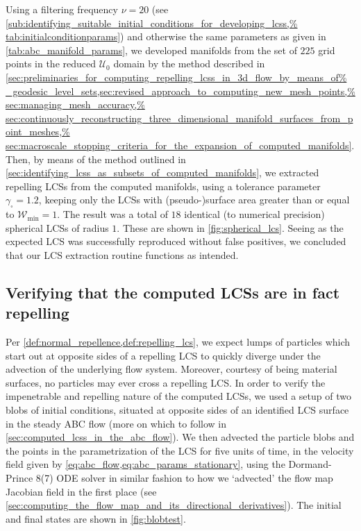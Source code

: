 Using a filtering frequency $\nu=20$ (see
\cref{sub:identifying_suitable_initial_conditions_for_developing_lcss,%
tab:initialconditionparams}) and otherwise the same parameters as given
in \cref{tab:abc_manifold_params}, we developed manifolds from the set
of $225$ grid points in the reduced $\mathcal{U}_{0}$ domain by the method
described in
\cref{sec:preliminaries_for_computing_repelling_lcss_in_3d_flow_by_means_of%
    _geodesic_level_sets,sec:revised_approach_to_computing_new_mesh_points,%
    sec:managing_mesh_accuracy,%
    sec:continuously_reconstructing_three_dimensional_manifold_surfaces_from_point_meshes,%
    sec:macroscale_stopping_criteria_for_the_expansion_of_computed_manifolds}.
Then, by means of the method outlined in
\cref{sec:identifying_lcss_as_subsets_of_computed_manifolds}, we extracted
repelling LCSs from the computed manifolds, using a tolerance parameter
$\gamma_{\square}=1.2$, keeping only the LCSs with (pseudo-)surface area
greater than or equal to $\mathcal{W}_{\min}=1$. The result was a total of
$18$ identical (to numerical precision) spherical LCSs of radius $1$. These are
shown in \cref{fig:spherical_lcs}. Seeing as the expected LCS was successfully
reproduced without false positives, we concluded that our LCS extraction
routine functions as intended.




\subsection{Verifying that the computed LCSs are in fact repelling}
\label{sub:verifying_that_the_computed_lcss_are_in_fact_repelling}

Per \cref{def:normal_repellence,def:repelling_lcs}, we expect lumps of particles
which start out at opposite sides of a repelling LCS to quickly diverge under
the advection of the underlying flow system. Moreover, courtesy of being
material surfaces, no particles may ever cross a repelling LCS. In order to
verify the impenetrable and repelling nature of the computed LCSs, we
used a setup of two blobs of initial conditions, situated at opposite sides of
an identified LCS surface in the steady ABC flow (more on which to follow in
\cref{sec:computed_lcss_in_the_abc_flow}). We then advected the particle blobs
and the points in the parametrization of the LCS for five units of time,
in the velocity field given by \cref{eq:abc_flow,eq:abc_params_stationary},
using the Dormand-Prince 8(7) ODE solver in similar fashion to how we
`advected' the flow map Jacobian field in the first place
(see \cref{sec:computing_the_flow_map_and_its_directional_derivatives}).
The initial and final states are shown in \cref{fig:blobtest}.

